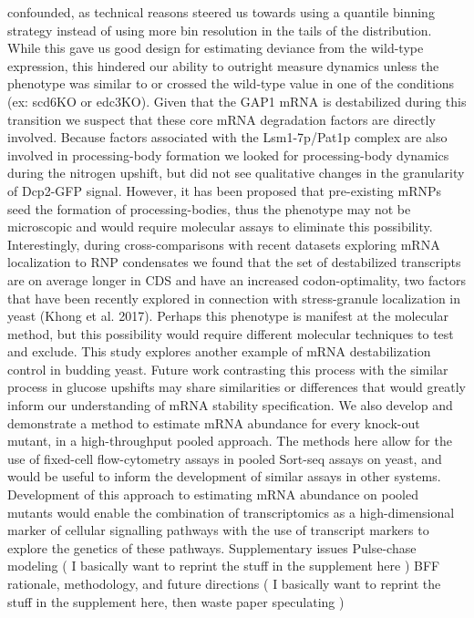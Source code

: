 confounded, as technical reasons steered us towards using a quantile
binning strategy instead of using more bin resolution in the tails of
the distribution. While this gave us good design for estimating
deviance from the wild-type expression, this hindered our ability to
outright measure dynamics unless the phenotype was similar to or
crossed the wild-type value in one of the conditions (ex: scd6KO or
edc3KO). Given that the GAP1 mRNA is destabilized during this
transition we suspect that these core mRNA degradation factors are
directly involved.  Because factors associated with the Lsm1-7p/Pat1p
complex are also involved in processing-body formation we looked for
processing-body dynamics during the nitrogen upshift, but did not see
qualitative changes in the granularity of Dcp2-GFP signal. However, it
has been proposed that pre-existing mRNPs seed the formation of
processing-bodies, thus the phenotype may not be microscopic and would
require molecular assays to eliminate this possibility. Interestingly,
during cross-comparisons with recent datasets exploring mRNA
localization to RNP condensates we found that the set of destabilized
transcripts are on average longer in CDS and have an increased
codon-optimality, two factors that have been recently explored in
connection with stress-granule localization in yeast (Khong et al.
2017). Perhaps this phenotype is manifest at the molecular method, but
this possibility would require different molecular techniques to test
and exclude.  This study explores another example of mRNA
destabilization control in budding yeast. Future work contrasting this
process with the similar process in glucose upshifts may share
similarities or differences that would greatly inform our
understanding of mRNA stability specification. We also develop and
demonstrate a method to estimate mRNA abundance for every knock-out
mutant, in a high-throughput pooled approach. The methods here allow
for the use of fixed-cell flow-cytometry assays in pooled Sort-seq
assays on yeast, and would be useful to inform the development of
similar assays in other systems. Development of this approach to
estimating mRNA abundance on pooled mutants would enable the
combination of transcriptomics as a high-dimensional marker of
cellular signalling pathways with the use of transcript markers to
explore the genetics of these pathways.  Supplementary issues
Pulse-chase modeling ( I basically want to reprint the stuff in the
supplement here ) BFF rationale, methodology, and future directions (
I basically want to reprint the stuff in the supplement here, then
waste paper speculating )

